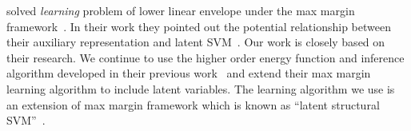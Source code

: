  solved \emph{learning} problem of lower
linear envelope under the max margin
framework~\cite{tsochantaridis2005large}. In their work they
pointed out the potential relationship between their auxiliary
representation and latent SVM~\cite{yu2009learning}. Our work is
closely based on their research. We continue to use the higher
order energy function and inference algorithm developed in their
previous work~\cite{Gould:ICML2011} and extend their max margin
learning algorithm to include latent variables. The learning
algorithm we use is an extension of max margin framework which is
known as ``latent structural SVM''~\cite{yu2009learning}.





